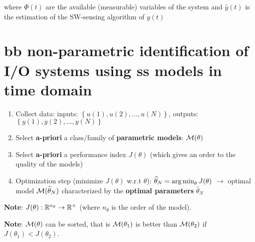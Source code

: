 where $\Phi(t)$ are the available (measurable) variables of the system and $\hat{y}(t)$ is the estimation of the SW-sensing algorithm of $y(t)$

\chapter{\acrlong{bb} non-parametric identification of I/O systems using \acrlong{ss} models in time domain}

\vspace{-12pt}
\begin{figure}[H]
    \centering
\end{figure}


\begin{rem}
\hfill \break
    \begin{enumerate}
        \item Collect data: inputs: $\left\{u(1), u(2), \ldots, u(N)\right\}$, outputs: $\left\{y(1), y(2), \ldots, y(N)\right\}$
        \item Select \textbf{a-priori} a class/family of \textbf{parametric models}: $\mathcal{M}(\theta)$
        \item Select \textbf{a-priori} a performance index $J(\theta)$ (which gives an order to the quality of the models)
        \item Optimization step (minimize $J(\theta)$ w.r.t $\theta$): $\widehat{\theta}_N = \operatorname*{arg\,min}_\theta J(\theta)$ $\rightarrow$ optimal model $\mathcal{M}(\widehat{\theta}_N)$ characterized by the \textbf{optimal parameters} $\hat{\theta}_N$
    \end{enumerate}
    
    \textbf{Note}:    $J(\theta): \mathbb{R}^{n_\theta} \rightarrow \mathbb{R}^+$ (where $n_\theta$ is the order of the model).
    
    \textbf{Note}: $\mathcal{M}(\theta)$ can be sorted, that is $\mathcal{M}(\theta_1)$ is better than $\mathcal{M}(\theta_2)$ if $J(\theta_1) < J(\theta_2)$.

\end{rem}


